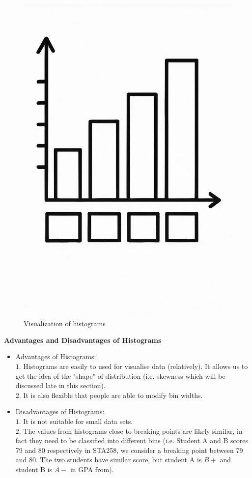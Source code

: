 \begin{figure}[H]
 \centering
 \includegraphics[scale=0.45]{Section1/img/Histogram.jpg}
 \caption{Visualization of histograms}
\end{figure} 

\textbf{Advantages and Disadvantages of Histograms}

\begin{itemize}
 \item Advantages of Histograms:\\
 $1.$ Histograms are easily to used for visualise data (relatively). It allows us to get the idea of the "shape" of distribution (i.e. skewness which will be discussed late in this section).\\
 $2.$ It is also flexible that people are able to modify bin widths.
 \item Disadvantages of Histograms:\\
 $1.$ It is not suitable for small data sets.\\
 $2.$ The values from histograms close to breaking points are likely similar, in fact they need to be classified into different bins (i.e. Student A and B scores 79 and 80 respectively in   STA258, we consider a breaking point between 79 and 80. The two students have similar score, but student A is $B+$ and student B is $A-$ in GPA from).
 \end{itemize}
 
